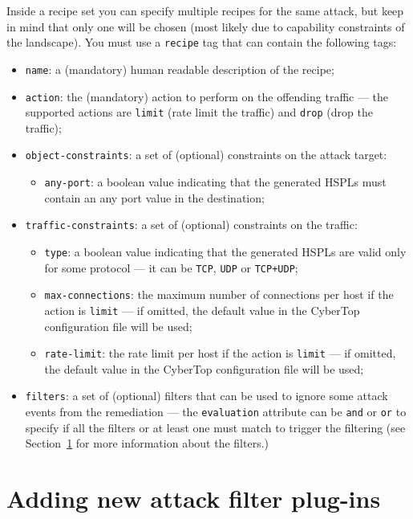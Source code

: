 \documentclass{scrartcl}
\begin{document}
Inside a recipe set you can specify multiple recipes for the same attack, but keep in mind that only one will be chosen (most likely due to capability constraints of the landscape). You must use a \lstinline|recipe| tag that can contain the following tags:

\begin{itemize}
	\item \lstinline|name|: a (mandatory) human readable description of the recipe;
	\item \lstinline|action|: the (mandatory) action to perform on the offending traffic --- the supported actions are \lstinline|limit| (rate limit the traffic) and \lstinline|drop| (drop the traffic);
	\item \lstinline|object-constraints|: a set of (optional) constraints on the attack target:
	\begin{itemize}
		\item \lstinline|any-port|: a boolean value indicating that the generated HSPLs must contain an any port value in the destination;
	\end{itemize}
	\item \lstinline|traffic-constraints|: a set of (optional) constraints on the traffic:
	\begin{itemize}
		\item \lstinline|type|: a boolean value indicating that the generated HSPLs are valid only for some protocol --- it can be \lstinline|TCP|, \lstinline|UDP| or \lstinline|TCP+UDP|;
		\item \lstinline|max-connections|: the maximum number of connections per host if the action is \lstinline|limit| --- if omitted, the default value in the CyberTop configuration file will be used;
		\item \lstinline|rate-limit|: the rate limit per host if the action is \lstinline|limit| --- if omitted, the default value in the CyberTop configuration file will be used;
	\end{itemize}
	\item \lstinline|filters|: a set of (optional) filters that can be used to ignore some attack events from the remediation --- the \lstinline|evaluation| attribute can be \lstinline|and| or \lstinline|or| to specify if all the filters or at least one must match to trigger the filtering (see Section~\ref{sec:addingNewAttackFilterPlugins} for more information about the filters.)
\end{itemize}

\section{Adding new attack filter plug-ins}
\label{sec:addingNewAttackFilterPlugins}
\end{document}
